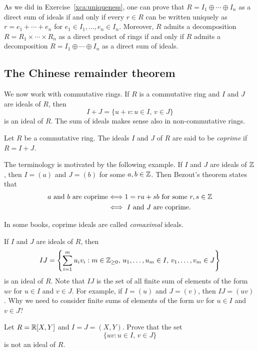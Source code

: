 As we did in Exercise~\ref{xca:uniqueness}, one can prove that 
$R=I_1\oplus\cdots\oplus I_n$ as a direct sum of ideals
if and only if every $r\in R$ can be written uniquely 
as $r=e_1+\cdots+e_n$ for $e_1\in I_1,\dots,e_n\in I_n$. Moreover, $R$ admits a decomposition 
$R=R_1\times\cdots\times R_n$ as a direct product 
of rings if and only if $R$ admits a decomposition 
$R=I_1\oplus\cdots\oplus I_n$ as 
a direct sum of ideals. 

\subsection{The Chinese remainder theorem}

We now work with commutative rings. 
If $R$ is a commutative ring and $I$ and $J$ are ideals of $R$, then
\[
I+J=\{u+v:u\in I,\,v\in J\}
\]
is an ideal of $R$. The sum of ideals makes sense also in non-commutative rings.  

\begin{definition}
	Let $R$ be a commutative ring. The ideals $I$ and $J$ of $R$ are said to be
	\emph{coprime} if $R=I+J$.  
\end{definition}

The terminology is motivated by the following example. If $I$ and $J$ are
ideals of $\mathbb{Z}$, then $I=(a)$ and $J=(b)$ for some $a,b\in\mathbb{Z}$. Then Bezout's theorem 
states that 
\begin{align*}
\text{$a$ and $b$ are coprime}
&\Longleftrightarrow 1=ra+sb\text{ for some $r,s\in\mathbb{Z}$}\\
&\Longleftrightarrow\text{ $I$ and $J$ are coprime.}
\end{align*}

In some books, coprime ideals are called \emph{comaximal} ideals. 

If $I$ and $J$ are ideals of $R$, then 
\[
	IJ=\left\{\sum_{i=1}^mu_iv_i:m\in\mathbb{Z}_{\geq0},\,u_1,\dots,u_m\in I,\,v_1,\dots,v_m\in J\right\}
\]
is an ideal of $R$. Note that 
$IJ$ is the set of all finite sum of elements of the form $uv$ for $u\in I$ and $v\in J$. 
For example, if $I=(u)$ and $J=(v)$, then $IJ=(uv)$. 
Why we need to consider finite sums of elements of the form $uv$
for $u\in I$ and $v\in J$?

\begin{exercise}
    \label{xca:IJ}
    Let $R=\mathbb{R}[X,Y]$ and $I=J=(X,Y)$. Prove that the
    set \[
    \{uv:u\in I,\,v\in J\}
    \]
    is not an ideal of $R$.
\end{exercise}


